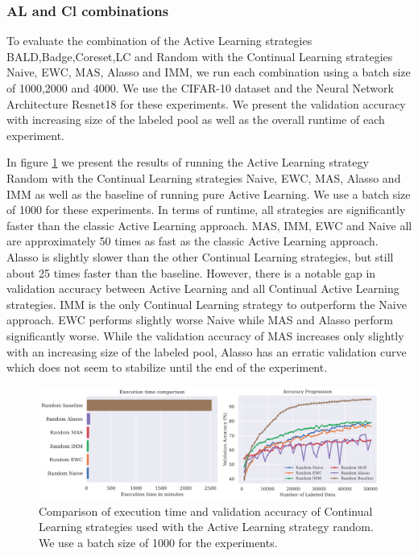 \subsubsection{AL and Cl combinations}
\label{sec:Evaluation:Results:CAL:ALCL}
To evaluate the combination of the Active Learning strategies BALD,Badge,Coreset,LC and Random with the Continual Learning strategies Naive, EWC, MAS, Alasso and IMM, we run each combination
using a batch size of 1000,2000 and 4000. We use the CIFAR-10 dataset and the Neural Network Architecture Resnet18 for these experiments. We present the validation accuracy with increasing
size of the labeled pool as well as the overall runtime of each experiment. \par
In figure \ref{fig:Evaluation:Results:CAL:Random1000} we present the results of running the Active Learning strategy Random with the Continual Learning strategies Naive, EWC, MAS, Alasso and IMM
as well as the baseline of running pure Active Learning. We use a batch size of 1000 for these experiments. In terms of runtime, all strategies are significantly faster than the classic Active
Learning approach. MAS, IMM, EWC and Naive all are approximately 50 times as fast as the classic Active Learning approach. Alasso is slightly slower than the other Continual Learning strategies,
but still about 25 times faster than the baseline. However, there is a notable gap in validation accuracy between Active Learning and all Continual Active Learning strategies. IMM is the only
Continual Learning strategy to outperform the Naive approach. EWC performs slightly worse Naive while MAS and Alasso perform significantly worse. While the validation accuracy of MAS increases only
slightly with an increasing size of the labeled pool, Alasso has an erratic validation curve which does not seem to stabilize until the end of the experiment. \par
\begin{figure}[h]
    \centering
    \includegraphics[width=\linewidth]{images/results_CAL/Random_CAL_1000b.png}
    \caption[Continual Active Learning Random 1000 batch size]{Comparison of execution time and validation accuracy of Continual Learning strategies used with the Active Learning strategy random.
    We use a batch size of 1000 for the experiments.}
    \label{fig:Evaluation:Results:CAL:Random1000}
\end{figure}

